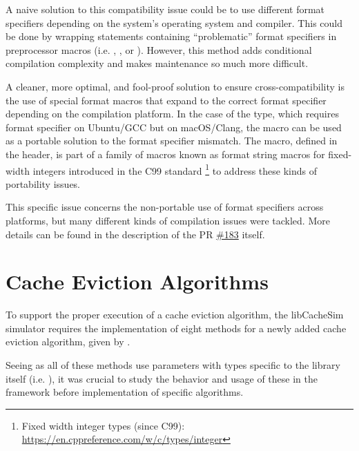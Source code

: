 \begin{description}[style=unboxed, leftmargin=0cm]
    \item[Naive solution] A naive solution to this compatibility issue could be to use different format specifiers depending on the system's operating system and compiler. This could be done by wrapping  statements containing \enquote{problematic} format specifiers in preprocessor macros (i.e. , , or ). However, this method adds conditional compilation complexity and makes maintenance so much more difficult. 
    \item[Improved solution] A cleaner, more optimal, and fool-proof solution to ensure cross-compatibility is the use of special format macros that expand to the correct format specifier depending on the compilation platform. In the case of the  type, which requires format specifier  on Ubuntu/GCC but  on macOS/Clang, the  macro can be used as a portable solution to the format specifier mismatch. The  macro, defined in the  header, is part of a family of macros known as format string macros for fixed-width integers introduced in the C99 standard \footnote{Fixed width integer types (since C99): \url{https://en.cppreference.com/w/c/types/integer}} to address these kinds of portability issues.
\end{description}

This specific issue concerns the non-portable use of format specifiers across platforms, but many different kinds of compilation issues were tackled. More details can be found in the description of the PR \href{https://github.com/1a1a11a/libCacheSim/pull/183}{\#183} itself.





\section{Cache Eviction Algorithms}\label{sec: cache-eviction-algs}

To support the proper execution of a cache eviction algorithm, the libCacheSim simulator requires the implementation of eight methods for a newly added cache eviction algorithm, given by .



Seeing as all of these methods use parameters with types specific to the library itself (i.e. ), it was crucial to study the behavior and usage of these in the framework before implementation of specific algorithms.

